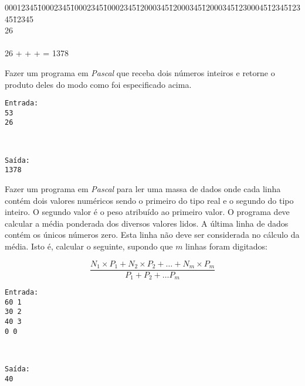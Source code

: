 \begin {tabbing}
00012345\=10002345\=10002345\=10002345\=12000345\=12000345\=12000345\=12300045\=12345\=12345\=12345       \\
26      \\
\\
26 + \>  + \>  +  = 1378
\end {tabbing}

Fazer um programa em \emph{Pascal}
que receba dois números inteiros e retorne o produto deles
do modo como foi especificado acima.

\begin{minipage}{5cm}
\begin{verbatim}
Entrada:
53
26
\end{verbatim}
\end{minipage} \
\begin{minipage}{5cm}
\begin{verbatim}
Saída:
1378
\end{verbatim}
\end{minipage}

\item Fazer um programa em \emph{Pascal} para
    ler  uma massa de dados onde  cada linha contém dois  valores numéricos
    sendo o primeiro do tipo real e o segundo do tipo inteiro. O segundo
    valor é o peso atribuído ao primeiro valor. O
    programa deve calcular a média ponderada dos diversos valores lidos.
    A última
    linha de  dados contém os  únicos números zero.  Esta linha não  deve ser
    considerada no cálculo da média. Isto é, calcular o seguinte, supondo
    que $m$ linhas foram digitados:

\[
\frac{N_1 \times P_1 + N_2 \times P_2 + \ldots + N_m \times P_m}{P_1 + 
 P_2 + \ldots P_m}
\]
\begin{minipage}{5cm}
\begin{verbatim}
Entrada:
60 1
30 2
40 3
0 0
\end{verbatim}
\end{minipage} \
\begin{minipage}{5cm}
\begin{verbatim}
Saída:
40
\end{verbatim}
\end{minipage}


